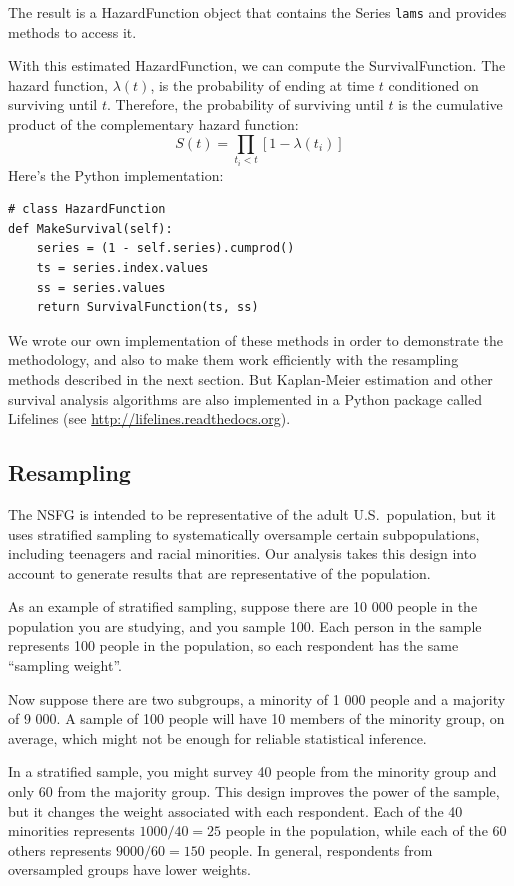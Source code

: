 \documentclass[journal]{IEEEtran}
\begin{document}
The result is a HazardFunction object that contains the Series
{\tt lams} and provides methods to access it.

With this estimated HazardFunction, we can compute the SurvivalFunction.
The hazard function, $\lambda(t)$, is the probability of ending at time $t$
conditioned on surviving until $t$.  Therefore, the probability
of surviving until $t$ is the cumulative product
of the complementary hazard function:
%
\begin{equation}
S(t) = \prod_{t_i < t} \left[1 - \lambda(t_i)\right]
\end{equation}
%
Here's the Python implementation:

\begin{verbatim}
# class HazardFunction
def MakeSurvival(self):
    series = (1 - self.series).cumprod()
    ts = series.index.values
    ss = series.values
    return SurvivalFunction(ts, ss)
\end{verbatim}

We wrote our own implementation of these methods in
order to demonstrate the methodology, and also to make them
work efficiently with the
resampling methods described in the next section.  But
Kaplan-Meier estimation and other survival analysis algorithms
are also implemented in a Python package called Lifelines
(see \url{http://lifelines.readthedocs.org}).


\subsection{Resampling}

The NSFG is intended to be representative of the adult U.S.\ population,
but it uses stratified sampling to systematically oversample certain
subpopulations, including teenagers and racial minorities.  Our analysis
takes this design into account to generate results that are
representative of the population.

As an example of stratified sampling, 
suppose there are 10 000 people in the population you are studying, and
you sample 100.  Each person in the sample represents 100 people in the
population, so each respondent has the same ``sampling weight''.

Now suppose there are two subgroups, a minority of 1 000 people and a 
majority of 9 000.  A sample of 100 people will have 10 members of the
minority group, on average, which might not be enough for reliable
statistical inference.

In a stratified sample, you might survey 40 people from the minority
group and only 60 from the majority group.  This design improves the power
of the sample, but it changes the weight associated with each respondent.
Each of the 40 minorities represents $1000 / 40 = 25$ people in the
population, while each of the 60 others represents $9000 / 60 = 150$ people.
In general, respondents from oversampled
groups have lower weights.
\end{document}
